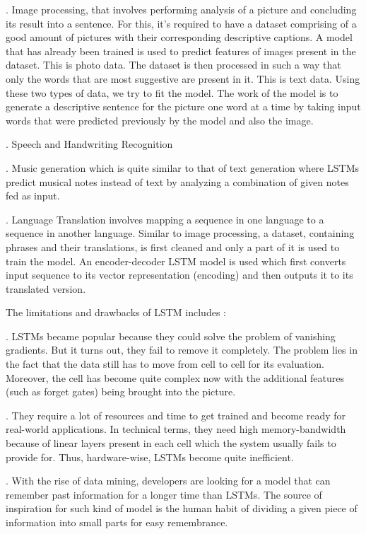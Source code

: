 \documentclass[12pt]{article}
\newcommand{\nd}{\noindent}
\begin{document}
\nd 2. Image processing, that involves performing analysis of a picture and concluding its result into a sentence. For this, it’s required to have a dataset comprising of a good amount of pictures with their corresponding descriptive captions. A model that has already been trained is used to predict features of images present in the dataset. This is photo data. The dataset is then processed in such a way that only the words that are most suggestive are present in it. This is text data. Using these two types of data, we try to fit the model. The work of the model is to generate a descriptive sentence for the picture one word at a time by taking input words that were predicted previously by the model and also the image.

\nd 3. Speech and Handwriting Recognition

\nd 4. Music generation which is quite similar to that of text generation where LSTMs predict musical notes instead of text by analyzing a combination of given notes fed as input.

\nd 5. Language Translation involves mapping a sequence in one language to a sequence in another language. Similar to image processing, a dataset, containing phrases and their translations, is first cleaned and only a part of it is used to train the model. An encoder-decoder LSTM model is used which first converts input sequence to its vector representation (encoding) and then outputs it to its translated version.

\nd The limitations and drawbacks of LSTM includes : 

\nd 1. LSTMs became popular because they could solve the problem of vanishing gradients. But it turns out, they fail to remove it completely. The problem lies in the fact that the data still has to move from cell to cell for its evaluation. Moreover, the cell has become quite complex now with the additional features (such as forget gates) being brought into the picture.

\nd 2. They require a lot of resources and time to get trained and become ready for real-world applications. In technical terms, they need high memory-bandwidth because of linear layers present in each cell which the system usually fails to provide for. Thus, hardware-wise, LSTMs become quite inefficient.

\nd 3. With the rise of data mining, developers are looking for a model that can remember past information for a longer time than LSTMs. The source of inspiration for such kind of model is the human habit of dividing a given piece of information into small parts for easy remembrance.
\end{document}
